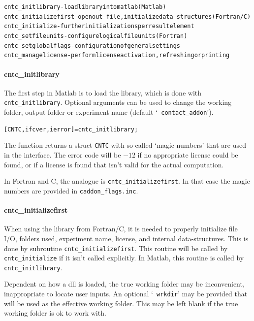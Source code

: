\documentclass[12pt]{report}
\begin{document}
\begin{alltt}\small
cntc_initlibrary          - load library into matlab (Matlab)
cntc_initializefirst      - open out-file, initialize data-structures (Fortran/C)
cntc_initialize           - further initializations per result element
cntc_setfileunits         - configure logical file units (Fortran)
cntc_setglobalflags       - configuration of general settings
cntc_managelicense        - perform license activation, refreshing or printing
\end{alltt}

\paragraph{cntc\_initlibrary}

The first step in Matlab is to load the library, which is done with {\tt
cntc\_\-init\-library}. Optional arguments can be used to change the
working folder, output folder or experiment name (default `{\tt 
contact\_addon}').
\begin{alltt}\small
   [CNTC, ifcver, ierror] = cntc_initlibrary;
\end{alltt}
The function returns a struct {\tt CNTC} with so-called `magic numbers'
that are used in the interface. The error code will be $-12$ if no
appropriate license could be found, or if a license is found that isn't
valid for the actual computation.

In Fortran and C, the analogue is {\tt cntc\_initializefirst}. In that
case the magic numbers are provided in {\tt caddon\_\-flags.\-inc}.

\paragraph{cntc\_initializefirst}

When using the library from Fortran/C, it is needed to properly
initialize file I/O, folders used, experiment name, license, and internal
data-structures. This is done by subroutine {\tt cntc\_initializefirst}.
This routine will be called by {\tt cntc\_initialize} if it isn't called
explicitly. In Matlab, this routine is called by {\tt cntc\_initlibrary}. 

Dependent on how a dll is loaded, the true working folder may be
inconvenient, inappropriate to locate user inputs. An optional `{\tt
wrkdir}' may be provided that will be used as the effective working folder.
This may be left blank if the true working folder is ok to work with.
\end{document}

